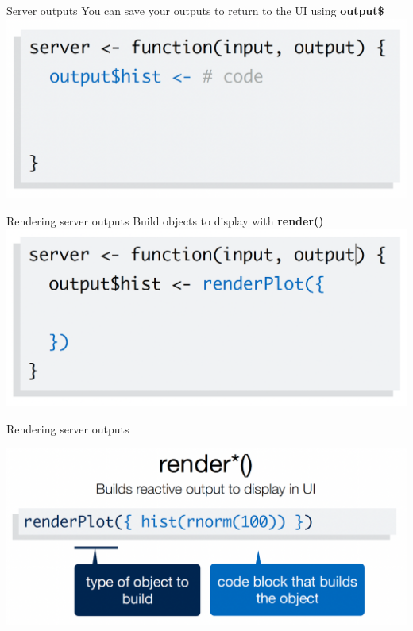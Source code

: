 \documentclass[
  ignorenonframetext,
]{beamer}
\begin{document}
\begin{frame}{Server outputs}
\label{server-outputs}
You can save your outputs to return to the UI using \textbf{output\$}
\center \includegraphics{shinyfigs/shiny_server_output2.png}
\end{frame}

\begin{frame}{Rendering server outputs}
\label{rendering-server-outputs}
Build objects to display with \textbf{render()} \center
\includegraphics{shinyfigs/shiny_render1.png}
\end{frame}

\begin{frame}{Rendering server outputs}
\label{rendering-server-outputs-1}
\center

\includegraphics{shinyfigs/shiny_render2.png}
\end{frame}
\end{document}
